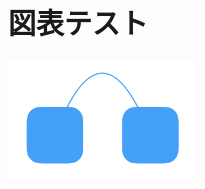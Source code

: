 \documentclass{jsarticle}
\begin{document}
\section{図表テスト}
\includegraphics[width=5cm]{sample_figure.png}
\end{document}
